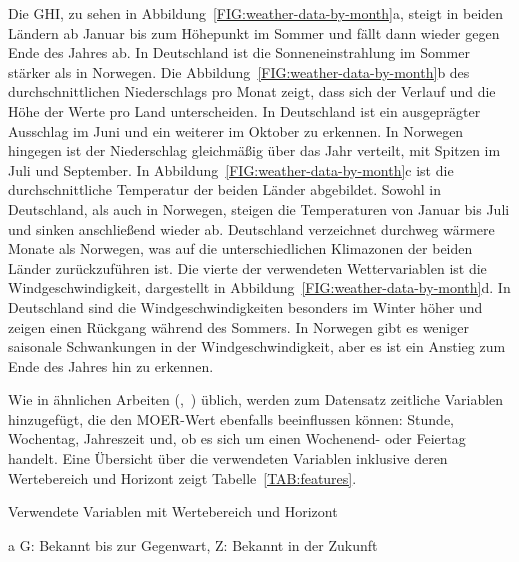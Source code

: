Die \ac{GHI}, zu sehen in Abbildung~\ref{FIG:weather-data-by-month}a, steigt in beiden Ländern ab Januar bis zum Höhepunkt im Sommer und fällt dann wieder gegen Ende des Jahres ab.
In Deutschland ist die Sonneneinstrahlung im Sommer stärker als in Norwegen.
Die Abbildung~\ref{FIG:weather-data-by-month}b des durchschnittlichen Niederschlags pro Monat zeigt, dass sich der Verlauf und die Höhe der Werte pro Land unterscheiden.
In Deutschland ist ein ausgeprägter Ausschlag im Juni und ein weiterer im Oktober zu erkennen.
In Norwegen hingegen ist der Niederschlag gleichmäßig über das Jahr verteilt, mit Spitzen im Juli und September.
In Abbildung~\ref{FIG:weather-data-by-month}c ist die durchschnittliche Temperatur der beiden Länder abgebildet.
Sowohl in Deutschland, als auch in Norwegen, steigen die Temperaturen von Januar bis Juli und sinken anschließend wieder ab.
Deutschland verzeichnet durchweg wärmere Monate als Norwegen, was auf die unterschiedlichen Klimazonen der beiden Länder zurückzuführen ist.
Die vierte der verwendeten Wettervariablen ist die Windgeschwindigkeit, dargestellt in Abbildung~\ref{FIG:weather-data-by-month}d.
In Deutschland sind die Windgeschwindigkeiten besonders im Winter höher und zeigen einen Rückgang während des Sommers.
In Norwegen gibt es weniger saisonale Schwankungen in der Windgeschwindigkeit, aber es ist ein Anstieg zum Ende des Jahres hin zu erkennen.

Wie in ähnlichen Arbeiten (\cite{Giacomazzi.06202023},~\cite{Labiadh.2.8.2023}) üblich, werden zum Datensatz zeitliche Variablen hinzugefügt, die den MOER-Wert ebenfalls beeinflussen können:
Stunde, Wochentag, Jahreszeit und, ob es sich um einen Wochenend- oder Feiertag handelt.
Eine Übersicht über die verwendeten Variablen inklusive deren Wertebereich und Horizont zeigt Tabelle~\ref{TAB:features}.
\begin{table}[ht]
 \centering
 \begin{threeparttable}
  \caption{Verwendete Variablen mit Wertebereich und Horizont}
  \label{TAB:features}
  
  \begin{tablenotes}
   \item[a] G: Bekannt bis zur Gegenwart, Z: Bekannt in der Zukunft
  \end{tablenotes}
 \end{threeparttable}
\end{table}

